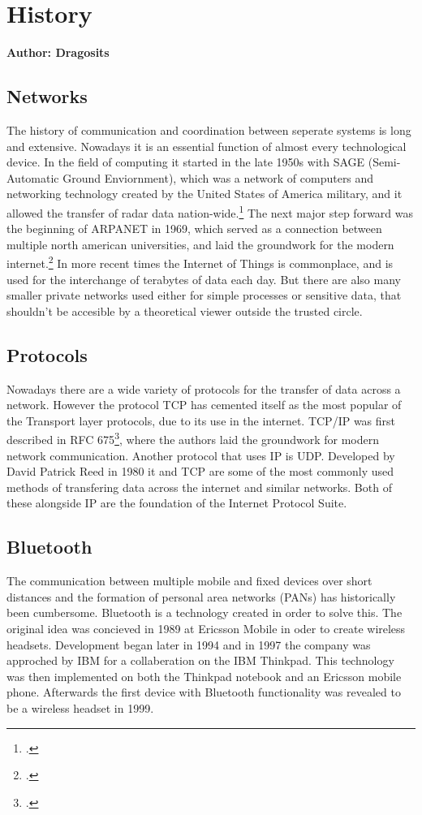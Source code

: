 \section{History}
\textbf{Author: Dragosits}
\subsection{Networks}
The history of communication and coordination between seperate systems is long and extensive. Nowadays it is an essential 
function of almost every technological device. In the field of computing it started in the late 1950s with SAGE (Semi-Automatic Ground Enviornment),
which was a network of computers and networking technology created by the United States of America military, 
and it allowed the transfer of radar data nation-wide.\footcite[][89]{A_New_History_of_Modern_Computing}
The next major step forward was the beginning of ARPANET in 1969, which served as a connection between multiple north american 
universities, and laid the groundwork for the modern internet.\footcite[][25]{How_the_web_was_born}
In more recent times the Internet of Things is commonplace, and is used for the interchange of terabytes of data each day. 
But there are also many smaller private networks used either for simple processes or sensitive data, that shouldn't be 
accesible by a theoretical viewer outside the trusted circle. 

\subsection{Protocols}
Nowadays there are a wide variety of protocols for the transfer of data across a network. However the protocol TCP has cemented 
itself as the most popular of the Transport layer protocols, due to its use in the internet. TCP/IP was first described in
RFC 675\footcite{rfc_675}, where the authors laid the groundwork for modern network communication. Another protocol that uses IP
is UDP. Developed by David Patrick Reed in 1980 it and TCP are some of the most commonly used methods of transfering data across
the internet and similar networks. Both of these alongside IP are the foundation of the Internet Protocol Suite.   

\subsection{Bluetooth}
The communication between multiple mobile and fixed devices over short distances and the formation of personal area networks (PANs)
has historically been cumbersome. Bluetooth is a technology created in order to solve this. The original idea was concieved in 1989
at Ericsson Mobile in oder to create wireless headsets. Development began later in 1994 and in 1997 the company was approched by IBM
for a collaberation on the IBM Thinkpad. This technology was then implemented on both the Thinkpad notebook and an Ericsson mobile phone.
Afterwards the first device with Bluetooth functionality was revealed to be a wireless headset in 1999.

